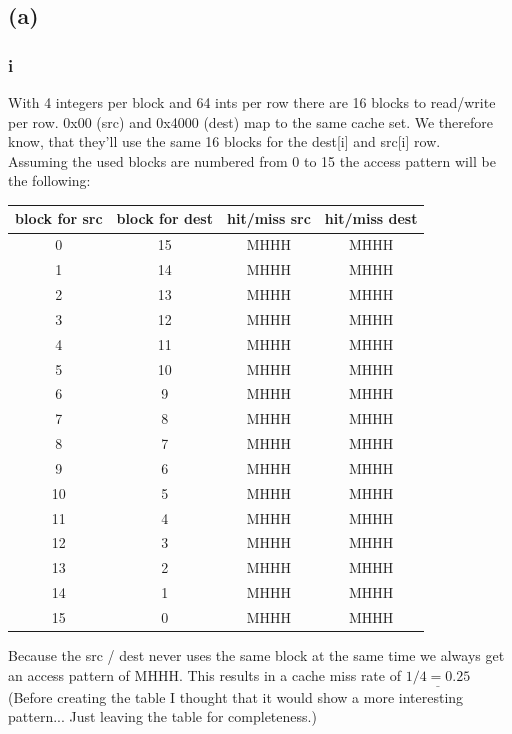 \documentclass[10pt,a4paper,oneside,notitlepage]{report}
\begin{document}
\subsection*{(a)}
\subsubsection*{i}
With 4 integers per block and 64 ints per row there are 16 blocks to read/write per row. 0x00 (src) and 0x4000 (dest) map to the same cache set. We therefore know, that they'll use the same 16 blocks for the dest[i] and src[i] row.  \\ Assuming the used blocks are numbered from 0 to 15 the access pattern will be the following: \\

\begin{tabular}{|c|c|c|c|}
\hline 
\rowcolor{gray!30}
\textbf{block for src} &\textbf{ block for dest} & \textbf{hit/miss src} & \textbf{hit/miss dest} \\ 
\hline 
0 & 15 & MHHH & MHHH \\ 
\hline 
1 & 14 & MHHH & MHHH \\ 
\hline 
2 & 13 & MHHH & MHHH \\ 
\hline 
3 & 12 & MHHH & MHHH \\ 
\hline 
4 & 11 & MHHH & MHHH \\ 
\hline 
5 & 10 & MHHH & MHHH \\ 
\hline 
6 & 9 & MHHH & MHHH \\ 
\hline 
7 & 8 & MHHH & MHHH \\ 
\hline 
8 & 7 & MHHH & MHHH \\ 
\hline 
9 & 6 & MHHH & MHHH \\ 
\hline 
10 & 5 & MHHH & MHHH \\ 
\hline 
11 & 4 & MHHH & MHHH \\ 
\hline 
12 & 3 & MHHH & MHHH \\ 
\hline 
13 & 2 & MHHH & MHHH \\ 
\hline 
14 & 1 & MHHH & MHHH \\ 
\hline 
15 & 0 & MHHH & MHHH \\ 
\hline 
\end{tabular} 

Because the src / dest never uses the same block at the same time we always get an access pattern of MHHH. This results in a cache miss rate of $\underline{1/4=0.25}$\\
(Before creating the table I thought that it would show a more interesting pattern... Just leaving the table for completeness.)
\end{document}
